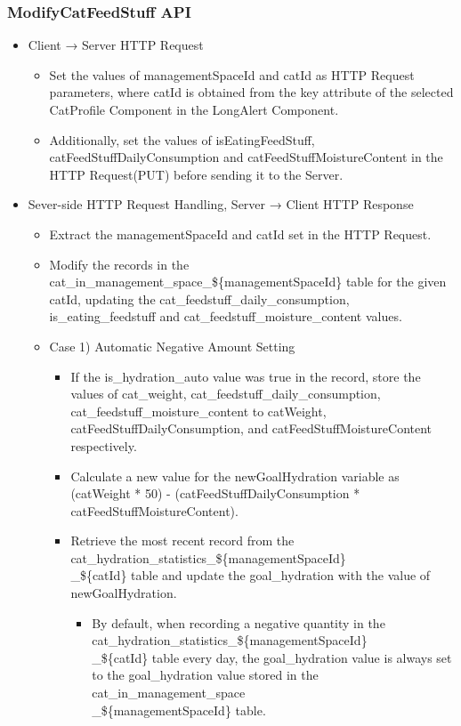 \documentclass[conference]{IEEEtran}
\begin{document}
\subsubsection{ModifyCatFeedStuff API}
\begin{itemize}
    \item Client → Server HTTP Request
    \begin{itemize}
        \item Set the values of managementSpaceId and catId as HTTP Request parameters, where catId is obtained from the key attribute of the selected CatProfile Component in the LongAlert Component.
        \item Additionally, set the values of isEatingFeedStuff, catFeedStuffDailyConsumption and catFeedStuffMoistureContent in the HTTP Request(PUT) before sending it to the Server.
        \\
    \end{itemize}
    \item Sever-side HTTP Request Handling, Server → Client HTTP Response
    \begin{itemize}
        \item Extract the managementSpaceId and catId set in the HTTP Request.
        \item Modify the records in the cat\_in\_management\_space\_\$\{managementSpaceId\} table for the given catId, updating the cat\_feedstuff\_daily\_consumption, is\_eating\_feedstuff and cat\_feedstuff\_moisture\_content values.
        \item Case 1) Automatic Negative Amount Setting
        \begin{itemize}
            \item If the is\_hydration\_auto value was true in the record, store the values of cat\_weight, cat\_feedstuff\_daily\_consumption, cat\_feedstuff\_moisture\_content to catWeight, catFeedStuffDailyConsumption, and catFeedStuffMoistureContent respectively.
            \item Calculate a new value for the newGoalHydration variable as (catWeight * 50) - (catFeedStuffDailyConsumption * catFeedStuffMoistureContent).
            \item Retrieve the most recent record from the cat\_hydration\_statistics\_\$\{managementSpaceId\}\\\_\$\{catId\} table and update the goal\_hydration with the value of newGoalHydration.
            \begin{itemize}
                \item By default, when recording a negative quantity in the cat\_hydration\_statistics\_\$\{managementSpaceId\}\\\_\$\{catId\} table every day, the goal\_hydration value is always set to the goal\_hydration value stored in the cat\_in\_management\_space\\\_\$\{managementSpaceId\} table.

\end{itemize}
\end{itemize}
\end{itemize}
\end{itemize}
\end{document}
